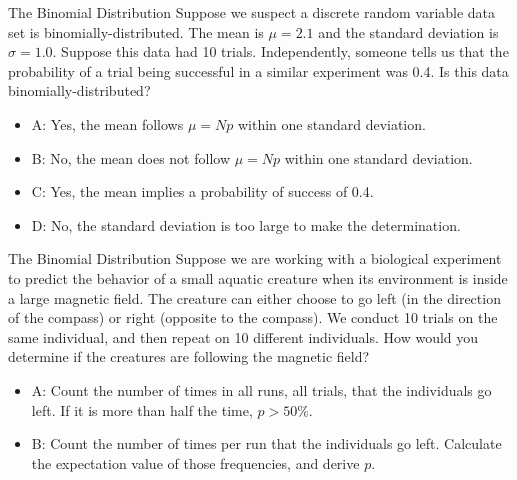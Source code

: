 \documentclass{beamer}
\begin{document}
\begin{frame}{The Binomial Distribution}
Suppose we suspect a discrete random variable data set is binomially-distributed.  The mean is $\mu = 2.1$ and the standard deviation is $\sigma = 1.0$.  Suppose this data had 10 trials.  Independently, someone tells us that the probability of a trial being successful in a similar experiment was 0.4.  Is this data binomially-distributed?
\begin{itemize}
\item A: Yes, the mean follows $\mu = N p$ within one standard deviation.
\item B: No, the mean does not follow $\mu = N p$ within one standard deviation.
\item C: Yes, the mean implies a probability of success of 0.4.
\item D: No, the standard deviation is too large to make the determination.
\end{itemize}
\end{frame}

\begin{frame}{The Binomial Distribution}
Suppose we are working with a biological experiment to predict the behavior of a small aquatic creature when its environment is inside a large magnetic field.  The creature can either choose to go left (in the direction of the compass) or right (opposite to the compass).  We conduct 10 trials on the same individual, and then repeat on 10 different individuals.  How would you determine if the creatures are following the magnetic field?
\begin{itemize}
\item A: Count the number of times in all runs, all trials, that the individuals go left.  If it is more than half the time, $p>50\%$.
\item B: Count the number of times per run that the individuals go left.  Calculate the expectation value of those frequencies, and derive $p$.
\end{itemize}
\end{frame}
\end{document}
